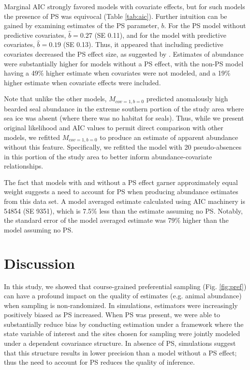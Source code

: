 \documentclass[times,mee,doublespace,]{besauth2}
\begin{document}
Marginal AIC strongly favored models with covariate effects, but for such models the presence of PS was equivocal (Table \ref{tab:aic}).  Further intuition can be gained by examining estimates of the PS parameter, $b$.  For the PS model without predictive covariates,  $\hat{b}=0.27$ (SE 0.11), and for the model with predictive covariates, $\hat{b}=0.19$ (SE 0.13).  Thus, it appeared that including predictive covariates decreased the PS effect size, as suggested by \citet{PatiEtAl2011}.  Estimates of abundance were substantially higher for models without a PS effect, with the non-PS model having a 49\% higher estimate when covariates were not modeled, and a 19\% higher estimate when covariate effects were included.

Note that unlike the other models, $M_{cov=1,b=0}$ predicted anomalously high bearded seal abundance in the extreme southern portion of the study area where sea ice was absent (where there was no habitat for seals).  Thus, while we present original likelihood and AIC values to permit direct comparison with other models, we refitted $M_{cov=1,b=0}$ to produce an estimate of apparent abundance without this feature. Specifically, we refitted the model with 20 pseudo-absences in this portion of the study area to better inform abundance-covariate relationships.

The fact that models with and without a PS effect garner approximately equal weight suggests a need to account for PS when producing abundance estimates from this data set.  A model averaged estimate calculated using AIC machinery \citep{BurnhamAnderson2002} is 54854 (SE 9351), which is 7.5\% less than the estimate assuming no PS.  Notably, the standard error of the model averaged estimate was 79\% higher than the model assuming no PS.

\section{Discussion}

In this study, we showed that course-grained preferential sampling (Fig. \ref{fig:pref}) can have a profound impact on the quality of estimates (e.g. animal abundance) when sampling is non-randomized. In simulations, estimators were increasingly positively biased as PS increased. When PS was present, we were able to substantially reduce bias by conducting estimation under a framework where the state variable of interest and the sites chosen for sampling were jointly modeled under a dependent covariance structure.  In absence of PS, simulations suggest that this structure results in lower precision than a model without a PS effect; thus the need to account for PS reduces the quality of inference.
\end{document}
